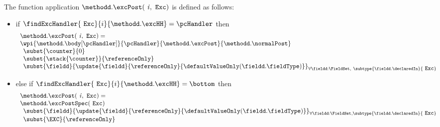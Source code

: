 \begin{defExc}\label{defExc}
The function application $\methodd.\excPost( \mbox{ \rm \textit{i}} ,  \mbox{ \rm \texttt{Exc}} ) $ is defined as follows:
 \begin{itemize}
      \item if $  \findExcHandler{\mbox{ \rm \texttt{Exc}} }{i}{\methodd.\excHH} = \pcHandler  $ then 
      $$ \begin{array}{l}
           \methodd.\excPost( \mbox{ \rm \textit{i}} ,  \mbox{ \rm \texttt{Exc}}) = \\
           \wpi{\methodd.\body[\pcHandler]}{\pcHandler}{\methodd.\excPost}{\methodd.\normalPost} \\
                      \begin{array}{l}
                        \subst{\counter}{0} \\
			\subst{\stack{\counter}}{\referenceOnly} \\
                         \subst{ \fieldd} { \update{\fieldd} { \referenceOnly }{\defaultValueOnly( \fieldd.  \fieldType ) } }_{{\small \forall \fieldd : \FieldSet, \ 
                         \subtype{\fieldd.\declaredIn}{ \mbox{ \rm \texttt{Exc}}} } } 
                       \end{array} 
        \end{array}$$   

      \item else if $\findExcHandler{ \mbox{ \rm \texttt{Exc}}   }{i}{\methodd.\excHH} = \bottom $ then 
            $$\begin{array}{l}
                    \methodd.\excPost( \mbox{ \rm \textit{i}} ,  \mbox{ \rm \texttt{Exc}}) = \\ \methodd.\excPostSpec( \mbox{ \rm \texttt{Exc}}  ) \\
                     \begin{array}{l}
                          
                          \subst{ \fieldd}{ \update{\fieldd } { \referenceOnly }{\defaultValueOnly( \fieldd.\fieldType ) } }_{ {\small \forall \fieldd: \FieldSet, 
			   \subtype{\fieldd.\declaredIn}{ \mbox{ \rm \texttt{Exc}}} } }    \\
                          \subst{ \EXC }{\referenceOnly  }
                    \end{array}  
             \end{array} $$
\end{itemize}
\end{defExc}


